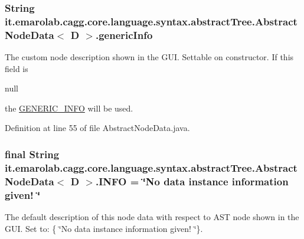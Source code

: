 \hypertarget{classit_1_1emarolab_1_1cagg_1_1core_1_1language_1_1syntax_1_1abstractTree_1_1AbstractNodeData_3_01D_01_4_a38f86084bc6923753e1355b32581db9e}{
\subsubsection[{generic\-Info}]{\setlength{\rightskip}{0pt plus 5cm}String it.\-emarolab.\-cagg.\-core.\-language.\-syntax.\-abstract\-Tree.\-Abstract\-Node\-Data$<$ D $>$.generic\-Info\hspace{0.3cm}{\ttfamily [protected]}}}\label{classit_1_1emarolab_1_1cagg_1_1core_1_1language_1_1syntax_1_1abstractTree_1_1AbstractNodeData_3_01D_01_4_a38f86084bc6923753e1355b32581db9e}
The custom node description shown in the G\-U\-I. Settable on constructor. If this field is
\begin{DoxyCode}
null 
\end{DoxyCode}
 the \hyperlink{classit_1_1emarolab_1_1cagg_1_1core_1_1language_1_1syntax_1_1abstractTree_1_1AbstractNodeData_3_01D_01_4_a26cd9d13d1d05af975d1571578b33755}{G\-E\-N\-E\-R\-I\-C\-\_\-\-I\-N\-F\-O} will be used. 

Definition at line 55 of file Abstract\-Node\-Data.\-java.

\hypertarget{classit_1_1emarolab_1_1cagg_1_1core_1_1language_1_1syntax_1_1abstractTree_1_1AbstractNodeData_3_01D_01_4_a6b6418feff55aa92262b82c78b008e77}{
\subsubsection[{I\-N\-F\-O}]{\setlength{\rightskip}{0pt plus 5cm}final String it.\-emarolab.\-cagg.\-core.\-language.\-syntax.\-abstract\-Tree.\-Abstract\-Node\-Data$<$ D $>$.I\-N\-F\-O = \char`\"{}No data instance information given! \char`\"{}\hspace{0.3cm}{\ttfamily [static]}}}\label{classit_1_1emarolab_1_1cagg_1_1core_1_1language_1_1syntax_1_1abstractTree_1_1AbstractNodeData_3_01D_01_4_a6b6418feff55aa92262b82c78b008e77}
The default description of this node data with respect to A\-S\-T node shown in the G\-U\-I. Set to\-: \{ \char`\"{}\-No data instance information given! \char`\"{}\}. 


